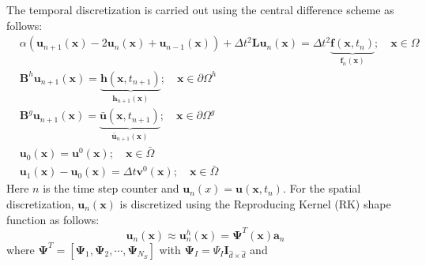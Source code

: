 \documentclass[10pt,letterpaper, onecolumn]{article}
\begin{document}
The temporal discretization is carried out using the central difference scheme as follows:
%
\begin{subequations}
\begin{align}
&\alpha ( \bm{u}_{n+1}(\bm{x}) -2\bm{u}_{n}(\bm{x}) + \bm{u}_{n-1}(\bm{x}) ) +
\Delta t^2 \bm{L} \bm{u}_{n}(\bm{x}) = 
\Delta t^2 \underbrace{\bm{f}(\bm{x},t_n)}_{\bm{f}_n(\bm{x})}; \quad \bm{x} \in \Omega \\
& \bm{B}^h \bm{u}_{n+1}(\bm{x}) = \underbrace{\bm{h} (\bm{x},t_{n+1})}_{\bm{h}_{n+1}(\bm{x})} ; \quad \bm{x} \in \partial \Omega^h \\
& \bm{B}^g \bm{u}_{n+1}(\bm{x}) = \underbrace{\bar{\bm{u}} (\bm{x},t_{n+1})}_{\bar{\bm{u}}_{n+1}(\bm{x})} ; \quad \bm{x} \in \partial \Omega^g \\
&\bm{u}_0 (\bm{x}) = \bm{u}^0(\bm{x}); \quad \bm{x} \in \bar{\Omega} \\
&\bm{u}_1 (\bm{x}) - \bm{u}_0 (\bm{x}) = \Delta t \bm{v}^0(\bm{x}); \quad \bm{x} \in \bar{\Omega}
\end{align}
\label{eqn7.36}
\end{subequations}
%
Here $n$ is the time step counter and $\bm{u}_n(x) = \bm{u}(\bm{x},t_n)$. For the spatial discretization, $\bm{u}_n(\bm{x})$ is discretized using the Reproducing Kernel (RK) shape function as follows:
%
\begin{equation}
\bm{u}_n(\bm{x}) \approx \bm{u}^h_n(\bm{x})=\bm{\Psi}^T (\bm{x}) \bm{a}_n
\label{eqn7.37}
\end{equation}
%
where $\bm{\Psi}^T = \left[ \bm{\Psi}_1, \bm{\Psi}_2, \cdots, \bm{\Psi}_{N_S} \right]$ with $\bm{\Psi}_I = \Psi_I \bm{I}_{\hat{d} \times \hat{d}}$ and 
\end{document}
